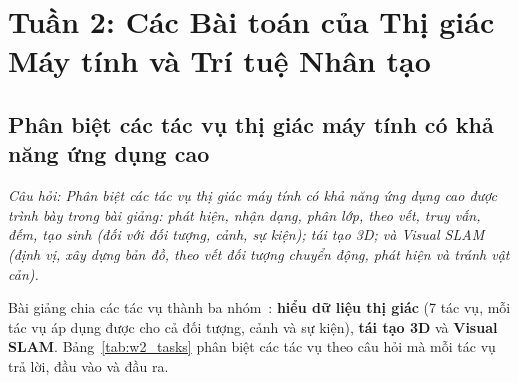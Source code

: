 \section{Tuần 2: Các Bài toán của Thị giác Máy tính và Trí tuệ Nhân tạo}
\label{sec:week2}

\subsection{Phân biệt các tác vụ thị giác máy tính có khả năng ứng dụng cao}
\label{subsec:w2_tasks}

\textit{Câu hỏi: Phân biệt các tác vụ thị giác máy tính có khả năng ứng dụng cao được trình bày trong bài giảng: phát hiện, nhận dạng, phân lớp, theo vết, truy vấn, đếm, tạo sinh (đối với đối tượng, cảnh, sự kiện); tái tạo 3D; và Visual SLAM (định vị, xây dựng bản đồ, theo vết đối tượng chuyển động, phát hiện và tránh vật cản).}

Bài giảng chia các tác vụ thành ba nhóm~\citep{xlav_ai4cv}: \textbf{hiểu dữ liệu thị giác} (7 tác vụ, mỗi tác vụ áp dụng được cho cả đối tượng, cảnh và sự kiện), \textbf{tái tạo 3D} và \textbf{Visual SLAM}. Bảng~\ref{tab:w2_tasks} phân biệt các tác vụ theo câu hỏi mà mỗi tác vụ trả lời, đầu vào và đầu ra.

